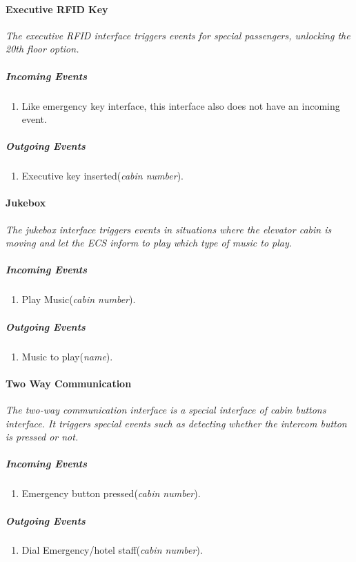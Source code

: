 \documentclass[12pt]{article}
\begin{document}
			
			\paragraph{Executive RFID Key}
			\textit{The executive RFID interface triggers events for special passengers, 
			unlocking the 20th floor option.}	
				\subparagraph{Incoming Events}
					\begin{enumerate}
						\item Like emergency key interface, this interface also does 
						not have an incoming event.
					\end{enumerate}
				
				\subparagraph{Outgoing Events}
					\begin{enumerate}
						\item Executive key inserted(\textit{cabin number}).
					\end{enumerate}
				
			
			\paragraph{Jukebox}
			\textit{The jukebox interface triggers events in situations where the elevator 
			cabin is moving and let the ECS inform to play which type of music to play.}
				\subparagraph{Incoming Events}
					\begin{enumerate}
						\item Play Music(\textit{cabin number}).
					\end{enumerate}
				\subparagraph{Outgoing Events}
					\begin{enumerate}
						\item Music to play(\textit{name}).
					\end{enumerate}
				
				
			\paragraph{Two Way Communication}
			\textit{The two-way communication interface is a special interface of cabin 
			buttons interface. It triggers special events such as detecting whether the 
			intercom button is pressed or not.}
				\subparagraph{Incoming Events}
					\begin{enumerate}
						\item Emergency button pressed(\textit{cabin number}).
					\end{enumerate}
				\subparagraph{Outgoing Events}
					\begin{enumerate}
						\item Dial Emergency/hotel staff(\textit{cabin number}).
					\end{enumerate}
			
\end{document}
